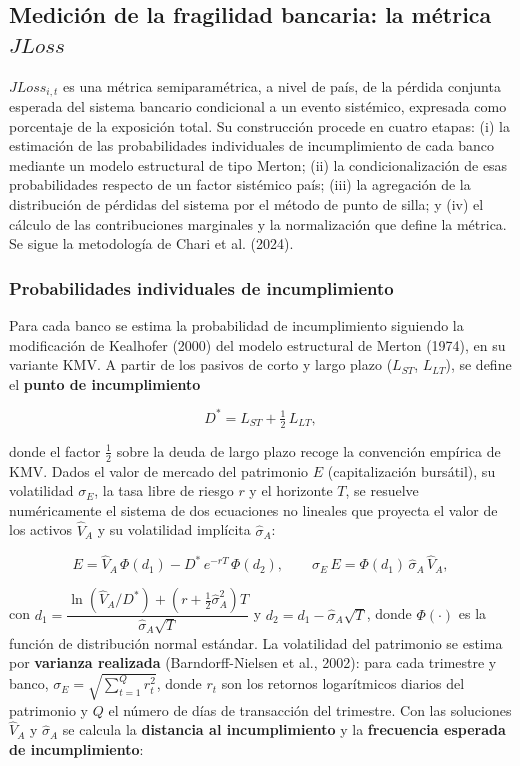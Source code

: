 \documentclass[5p,times,twocolumn,authoryear]{elsarticle}
\begin{document}
\subsection{Medición de la fragilidad bancaria: la métrica $JLoss$}

$JLoss_{i,t}$ es una métrica semiparamétrica, a nivel de país, de la pérdida conjunta esperada del sistema bancario condicional a un evento sistémico, expresada como porcentaje de la exposición total. Su construcción procede en cuatro etapas: (i) la estimación de las probabilidades individuales de incumplimiento de cada banco mediante un modelo estructural de tipo Merton; (ii) la condicionalización de esas probabilidades respecto de un factor sistémico país; (iii) la agregación de la distribución de pérdidas del sistema por el método de punto de silla; y (iv) el cálculo de las contribuciones marginales y la normalización que define la métrica. Se sigue la metodología de Chari et al. (2024).

\subsubsection{Probabilidades individuales de incumplimiento}

Para cada banco se estima la probabilidad de incumplimiento siguiendo la modificación de Kealhofer (2000) del modelo estructural de Merton (1974), en su variante KMV. A partir de los pasivos de corto y largo plazo ($L_{ST}$, $L_{LT}$), se define el \textbf{punto de incumplimiento}

\[ D^{*} = L_{ST} + \tfrac{1}{2}\,L_{LT}, \]

donde el factor $\tfrac{1}{2}$ sobre la deuda de largo plazo recoge la convención empírica de KMV. Dados el valor de mercado del patrimonio $E$ (capitalización bursátil), su volatilidad $\sigma_E$, la tasa libre de riesgo $r$ y el horizonte $T$, se resuelve numéricamente el sistema de dos ecuaciones no lineales que proyecta el valor de los activos $\hat V_A$ y su volatilidad implícita $\hat\sigma_A$:

\[ E = \hat V_A\,\Phi(d_1) - D^{*}\,e^{-rT}\,\Phi(d_2), \qquad \sigma_E\,E = \Phi(d_1)\,\hat\sigma_A\,\hat V_A, \]

con $d_1 = \dfrac{\ln(\hat V_A/D^{*}) + \left(r + \tfrac{1}{2}\hat\sigma_A^{2}\right)T}{\hat\sigma_A\sqrt{T}}$ y $d_2 = d_1 - \hat\sigma_A\sqrt{T}$, donde $\Phi(\cdot)$ es la función de distribución normal estándar. La volatilidad del patrimonio se estima por \textbf{varianza realizada} (Barndorff-Nielsen et al., 2002): para cada trimestre y banco, $\sigma_E = \sqrt{\sum_{t=1}^{Q} r_t^{2}}$, donde $r_t$ son los retornos logarítmicos diarios del patrimonio y $Q$ el número de días de transacción del trimestre. Con las soluciones $\hat V_A$ y $\hat\sigma_A$ se calcula la \textbf{distancia al incumplimiento} y la \textbf{frecuencia esperada de incumplimiento}:
\end{document}
